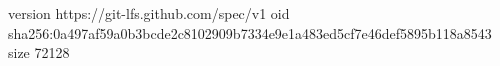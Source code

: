 version https://git-lfs.github.com/spec/v1
oid sha256:0a497af59a0b3bcde2c8102909b7334e9e1a483ed5cf7e46def5895b118a8543
size 72128
